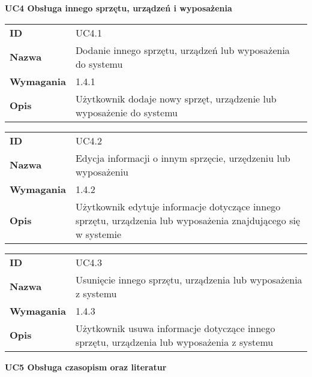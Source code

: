 \vspace{.03\textheight}
\begin{center}
  {\Large\bf UC4 Obsługa innego sprzętu, urządzeń i wyposażenia } \\
\end{center}
\vspace{.02\textheight}

\begin{tabular}{p{}p{}}
\hfill {\bf ID} & UC4.1  \\
\hfill {\bf Nazwa} & Dodanie innego sprzętu, urządzeń lub wyposażenia do systemu \\
\hfill {\bf Wymagania} & 1.4.1 \\
\hfill {\bf Opis} &  Użytkownik dodaje nowy sprzęt, urządzenie lub wyposażenie do systemu \\
\end{tabular}

\vspace{.05\textheight}

\begin{tabular}{p{}p{}}
\hfill {\bf ID} & UC4.2 \\
\hfill {\bf Nazwa} & Edycja informacji o innym sprzęcie, urzędzeniu lub wyposażeniu \\
\hfill {\bf Wymagania} & 1.4.2  \\
\hfill {\bf Opis} & Użytkownik edytuje informacje dotyczące innego sprzętu, urządzenia lub wyposażenia znajdującego się w systemie \\
\end{tabular}

\vspace{.05\textheight}

\begin{tabular}{p{}p{}}
\hfill {\bf ID} & UC4.3  \\
\hfill {\bf Nazwa} & Usunięcie innego sprzętu, urządzenia lub wyposażenia z systemu \\
\hfill {\bf Wymagania} & 1.4.3 \\
\hfill {\bf Opis} & Użytkownik usuwa informacje dotyczące innego sprzętu, urządzenia lub wyposażenia z systemu \\
\end{tabular}

\vspace{.03\textheight}
\begin{center}
  {\Large\bf UC5 Obsługa czasopism oraz literatur } \\
\end{center}
\vspace{.02\textheight}

